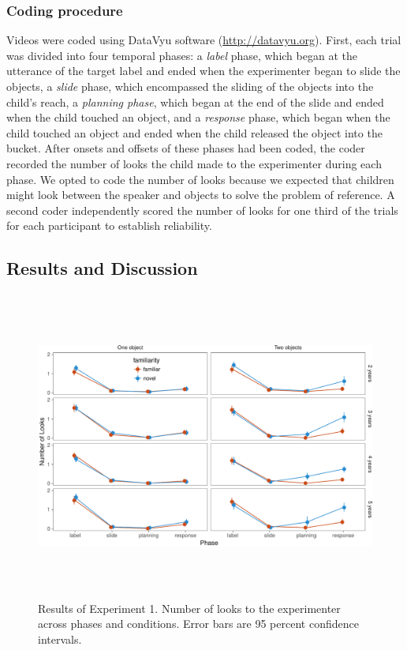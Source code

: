 \documentclass[10pt, letterpaper]{article}
\newenvironment{CodeChunk}{}{}
\begin{document}
\subsubsection{Coding procedure}\label{coding-procedure}

Videos were coded using DataVyu software (\url{http://datavyu.org}).
First, each trial was divided into four temporal phases: a \emph{label}
phase, which began at the utterance of the target label and ended when
the experimenter began to slide the objects, a \emph{slide} phase, which
encompassed the sliding of the objects into the child's reach, a
\emph{planning phase}, which began at the end of the slide and ended
when the child touched an object, and a \emph{response} phase, which
began when the child touched an object and ended when the child released
the object into the bucket. After onsets and offsets of these phases had
been coded, the coder recorded the number of looks the child made to the
experimenter during each phase. We opted to code the number of looks
because we expected that children might look between the speaker and
objects to solve the problem of reference. A second coder independently
scored the number of looks for one third of the trials for each
participant to establish reliability.

\subsection{Results and Discussion}\label{results-and-discussion}

\begin{CodeChunk}
\begin{figure}[h]

{\centering \includegraphics[width=6.5in,height=4in]{figs/results_e1-1} 

}

\caption[Results of Experiment 1]{Results of Experiment 1. Number of looks to the experimenter across phases and conditions. Error bars are 95 percent confidence intervals.}\label{fig:results_e1}
\end{figure}
\end{CodeChunk}
\end{document}
